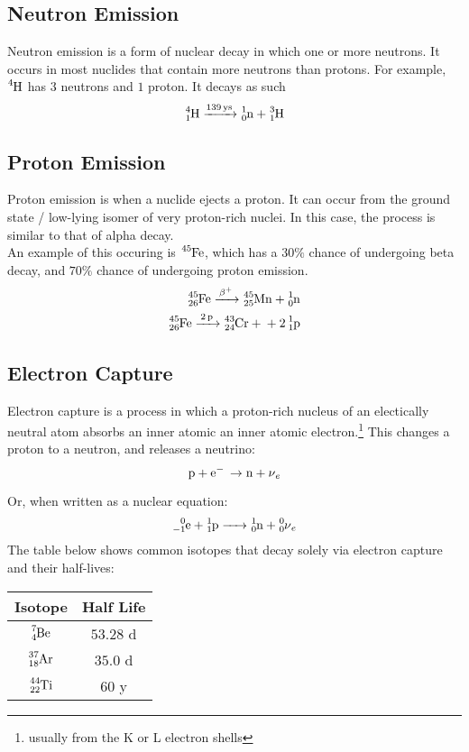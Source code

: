 \documentclass{article}
\begin{document}
\begin{multicols*}{2}
    \subsection{Neutron Emission}
    Neutron emission is a form of nuclear decay in which one or more neutrons.
    It occurs in most nuclides that contain more neutrons than protons. For
    example, $\ce{^{4}H}$ has $3$ neutrons and $1$ proton. It decays as such
    \[
      \ce{^{4}_{1}H ->[139 ys] ^{1}_{0}n + ^{3}_{1}H}
    \]
    
    \subsection{Proton Emission}
    Proton emission is when a nuclide ejects a proton. It can occur from
    the ground state / low-lying isomer of very proton-rich nuclei. In
    this case, the process is similar to that of alpha decay.\\

    An example of this occuring is $\ce{^{45}Fe}$, which has a $30\%$ chance
    of undergoing beta decay, and $70\%$ chance of undergoing proton emission.
    \begin{equation*}
      \begin{split}
        \ce{^{45}_{26}Fe ->[\beta^{+}] ^{45}_{25}Mn + ^{1}_{0}n} \\
        \ce{^{45}_{26}Fe ->[2p] ^{43}_{24}Cr + + 2 ^{1}_{1}p}
      \end{split}
    \end{equation*}

    \subsection{Electron Capture}
    Electron capture is a process in which a proton-rich nucleus of an electically
    neutral atom absorbs an inner atomic an inner atomic electron.\footnote{usually from the K or L electron shells}
    This changes a proton to a neutron, and releases a neutrino:
    \[
      \ce{p + e- \to n + \nu_e}
    \]

    Or, when written as a nuclear equation:
    \[
      \ce{^{0}_{-1}e + ^{1}_{1}p -> ^{1}_{0}n + ^{0}_{0}\nu_{e}}
    \]
    The table below shows common isotopes that decay solely via electron capture
    and their half-lives: \\

    \begin{tabular}{|c|c|}
      \hline
      \textbf{Isotope} & \textbf{Half Life} \\
      \hline
      $\ce{^{7}_{4}Be}$ & $53.28$ d \\
      $\ce{^{37}_{18}Ar}$ & $35.0$ d \\
      $\ce{^{44}_{22}Ti}$ & $60$ y \\
      \hline
    \end{tabular}


\end{multicols*}
\end{document}
